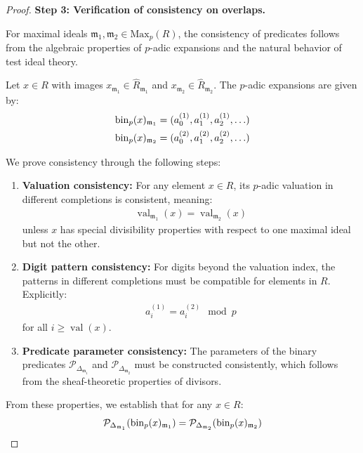 \begin{proof}
\textbf{Step 3: Verification of consistency on overlaps.}

For maximal ideals $\mathfrak{m}_1, \mathfrak{m}_2 \in \text{Max}_p(R)$, the consistency of predicates follows from the algebraic properties of $p$-adic expansions and the natural behavior of test ideal theory.

Let $x \in R$ with images $x_{\mathfrak{m}_1} \in \hat{R}_{\mathfrak{m}_1}$ and $x_{\mathfrak{m}_2} \in \hat{R}_{\mathfrak{m}_2}$. The $p$-adic expansions are given by:
\begin{align*}
\operatorname{bin}_p(x)_{\mathfrak{m}_1} &= (a_0^{(1)}, a_1^{(1)}, a_2^{(1)}, \ldots) \\
\operatorname{bin}_p(x)_{\mathfrak{m}_2} &= (a_0^{(2)}, a_1^{(2)}, a_2^{(2)}, \ldots)
\end{align*}

We prove consistency through the following steps:

\begin{enumerate}
    \item \textbf{Valuation consistency:} For any element $x \in R$, its $p$-adic valuation in different completions is consistent, meaning:
    \begin{align*}
    \operatorname{val}_{\mathfrak{m}_1}(x) = \operatorname{val}_{\mathfrak{m}_2}(x)
    \end{align*}
    unless $x$ has special divisibility properties with respect to one maximal ideal but not the other.
    
    \item \textbf{Digit pattern consistency:} For digits beyond the valuation index, the patterns in different completions must be compatible for elements in $R$. Explicitly:
    \begin{align*}
    a_i^{(1)} = a_i^{(2)} \mod p
    \end{align*}
    for all $i \geq \operatorname{val}(x)$.
    
    \item \textbf{Predicate parameter consistency:} The parameters of the binary predicates $\mathcal{P}_{\Delta_{\mathfrak{m}_1}}$ and $\mathcal{P}_{\Delta_{\mathfrak{m}_2}}$ must be constructed consistently, which follows from the sheaf-theoretic properties of divisors.
\end{enumerate}

From these properties, we establish that for any $x \in R$:
\begin{align*}
\mathcal{P}_{\Delta_{\mathfrak{m}_1}}(\operatorname{bin}_p(x)_{\mathfrak{m}_1}) = \mathcal{P}_{\Delta_{\mathfrak{m}_2}}(\operatorname{bin}_p(x)_{\mathfrak{m}_2})
\end{align*}


\end{proof}
